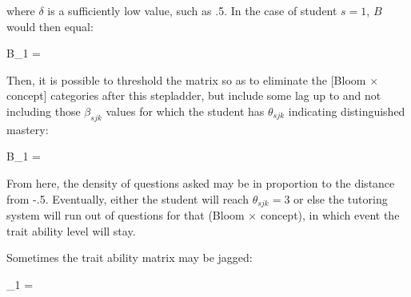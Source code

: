 where $\delta$ is a sufficiently low value, such as .5.  In the case of
student $s=1$, $B$ would then equal:

\begin{equations}
B_1 =
\end{equations}
\vspace{12pt}

Then, it is possible to threshold the matrix so as to eliminate the [Bloom
$\times$ concept] categories after this stepladder, but include some lag up to
and not including those $\beta_{sjk}$ values for which the student has
$\theta_{sjk}$ indicating distinguished mastery:

\begin{equations}
B_1 =
\end{equations}
\vspace{12pt}

From here, the density of questions asked may be in proportion to the distance
from -.5.  Eventually, either the student will reach $\theta_{sjk} = 3$ or else
the tutoring system will run out of questions for that (Bloom $\times$
concept), in which event the trait ability level will stay.

Sometimes the trait ability matrix may be jagged:

\begin{equations}
\Theta_1 =
\end{equations}
\vspace{12pt}

